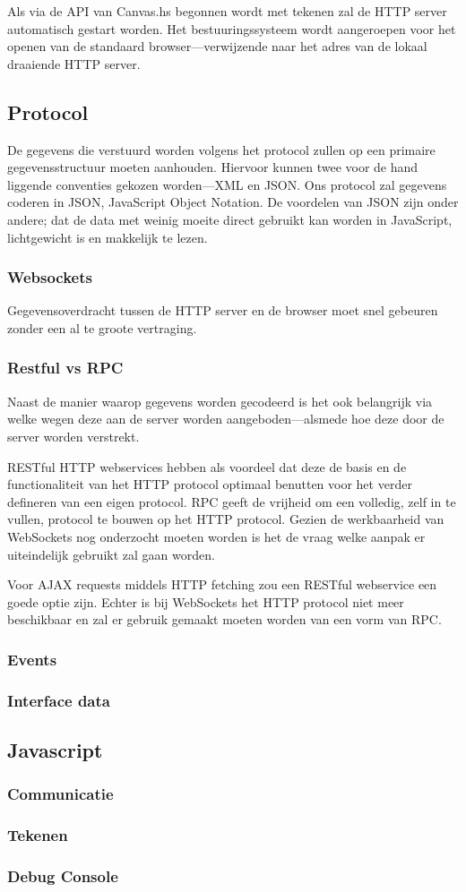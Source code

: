 \documentclass[a4paper]{report}
\begin{document}
Als via de API van Canvas.hs begonnen wordt met tekenen zal de HTTP server automatisch gestart worden. Het bestuuringssysteem wordt aangeroepen voor het openen van de standaard browser—verwijzende naar het adres van de lokaal draaiende HTTP server.
\subsection{Protocol}
De gegevens die verstuurd worden volgens het protocol zullen op een primaire gegevensstructuur moeten aanhouden. Hiervoor kunnen twee voor de hand liggende conventies gekozen worden—XML en JSON. Ons protocol zal gegevens coderen in JSON, JavaScript Object Notation. De voordelen van JSON zijn onder andere; dat de data met weinig moeite direct gebruikt kan worden in JavaScript, lichtgewicht is en makkelijk te lezen.
\subsubsection{Websockets}
Gegevensoverdracht tussen de HTTP server en de browser moet snel gebeuren zonder een al te groote vertraging.
\subsubsection{Restful vs RPC}
Naast de manier waarop gegevens worden gecodeerd is het ook belangrijk via welke wegen deze aan de server worden aangeboden—alsmede hoe deze door de server worden verstrekt.

RESTful HTTP webservices hebben als voordeel dat deze de basis en de functionaliteit van het HTTP protocol optimaal benutten voor het verder defineren van een eigen protocol. RPC geeft de vrijheid om een volledig, zelf in te vullen, protocol te bouwen op het HTTP protocol. Gezien de werkbaarheid van WebSockets nog onderzocht moeten worden is het de vraag welke aanpak er uiteindelijk gebruikt zal gaan worden.

Voor AJAX requests middels HTTP fetching zou een RESTful webservice een goede optie zijn. Echter is bij WebSockets het HTTP protocol niet meer beschikbaar en zal er gebruik gemaakt moeten worden van een vorm van RPC. 
\subsubsection{Events}

\subsubsection{Interface data}
\subsection{Javascript}
\subsubsection{Communicatie}
\subsubsection{Tekenen}
\subsubsection{Debug Console}

\newpage


\end{document}
